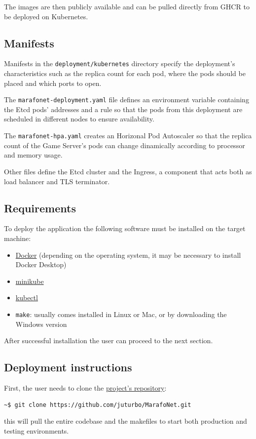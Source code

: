 \documentclass{scrartcl}
\begin{document}
The images are then publicly available and can be pulled directly from GHCR
to be deployed on Kubernetes.
\subsection{Manifests}
Manifests in the \texttt{deployment/kubernetes} directory specify the deployment's
characteristics such as the replica count for each pod, where the pods should be placed 
and which ports to open.

The \texttt{marafonet-deployment.yaml} file defines an environment variable containing
the Etcd pods' addresses and a rule so that the pods from this deployment are scheduled
in different nodes to ensure availability.

The \texttt{marafonet-hpa.yaml} creates an Horizonal Pod Autoscaler so that the replica
count of the Game Server's pods can change dinamically according to processor and memory
usage.

Other files define the Etcd cluster and the Ingress, a component that acts both as load 
balancer and TLS terminator.
\subsection{Requirements}\label{deployment-requirements}
To deploy the application the following software must be installed on the target machine:
\begin{itemize}
  \item \href{https://docs.docker.com/engine/install}{Docker} (depending on the operating system, it may be necessary to install Docker Desktop)
  \item \href{https://minikube.sigs.k8s.io/docs/start}{minikube}
  \item \href{https://kubernetes.io/docs/tasks/tools/#kubectl}{kubectl}
  \item \texttt{make}: usually comes installed in Linux or Mac, or by downloading the Windows version
\end{itemize}
After successful installation the user can proceed to the next section.
%
\subsection{Deployment instructions}
First, the user needs to clone the \href{https://github.com/juturbo/MarafoNet}{project's repository}:
\begin{lstlisting}[language=bash]
  ~$ git clone https://github.com/juturbo/MarafoNet.git
\end{lstlisting}
this will pull the entire codebase and the makefiles to start both production and testing environments.
\end{document}
